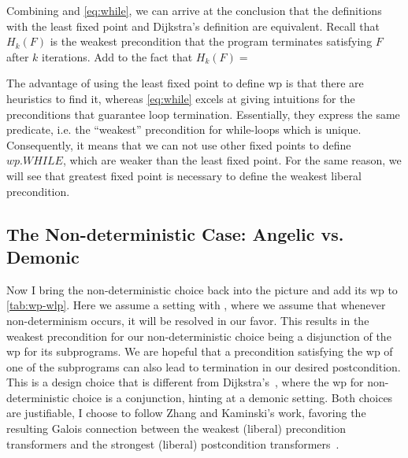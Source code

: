 Combining  and \autoref{eq:while}, we can arrive at the conclusion that the definitions with the least fixed point and Dijkstra's definition are equivalent.
Recall that $H_k(F)$ is the weakest precondition that the program terminates satisfying $F$ after  $k$ iterations. 
Add to the fact that $H_k(F)=$

The advantage of using the least fixed point to define wp is that there are heuristics to find it, whereas \autoref{eq:while} excels at giving intuitions for the preconditions that guarantee loop termination. 
Essentially, they express the same predicate, i.e. the ``weakest'' precondition for while-loops which is unique. 
Consequently, it means that we can not use other fixed points to define $wp.WHILE$, which are weaker than the least fixed point. 
For the same reason, we will see that greatest fixed point is necessary to define the weakest liberal precondition. 


\subsection{The Non-deterministic Case: Angelic vs. Demonic}\label{sec:wp-nondet}
Now I bring the non-deterministic choice back into the picture and add its wp to \autoref{tab:wp-wlp}. 
Here we assume a setting with , where we assume that whenever non-determinism occurs, it will be resolved in our favor.
This results in the weakest precondition for our non-deterministic choice being a disjunction of the wp for its subprograms. 
We are hopeful that a precondition satisfying the wp of one of the subprograms can also lead to termination in our desired postcondition. 
This is a design choice that is different from Dijkstra's~\cite{dijkstra75}, where the wp for non-deterministic choice is a conjunction, hinting at a demonic setting. 
Both choices are justifiable, I choose to follow Zhang and Kaminski's work, favoring the resulting Galois connection between the weakest (liberal) precondition transformers and the strongest (liberal) postcondition transformers~\cite{zhang22}. 


